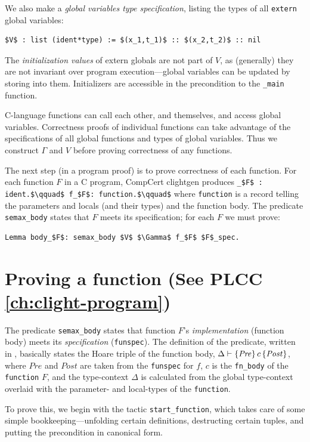 \documentclass[12pt,fleqn,openany,oneside,showtrims]{memoir}
\newcommand{\ychapter}[2]{\chapter[#1]{#1 \hfill \normalsize #2}}
\begin{document}
We also make a \emph{global variables type specification}, listing the 
types of all \lstinline{extern} global variables:
\begin{lstlisting}
$V$ : list (ident*type) := $(x_1,t_1)$ :: $(x_2,t_2)$ :: nil
\end{lstlisting}
The \emph{initialization values} of extern globals are not part of $V$,
as (generally) they are not invariant over program execution---global
variables can be updated by storing into them.  Initializers are accessible
in the precondition to the \lstinline{_main} function.

C-language functions can call each other, and themselves, and access global variables.  Correctness proofs of individual functions can take advantage of the
specifications of all global functions and types of global variables.
Thus we construct $\Gamma$ and $V$ before proving correctness of any
functions.

The next  step (in a program proof) is to prove correctness of each function.
For each function $F$  in a C program, CompCert clightgen produces\linebreak
\lstinline{_$F$ : ident.$\qquad$ f_$F$: function.$\qquad$}
where \lstinline{function} is a record telling the parameters and locals (and their types) and the function body.  The predicate \lstinline{semax_body} states that $F$ meets its specification; for each $F$ we must prove:
\begin{lstlisting}
Lemma body_$F$: semax_body $V$ $\Gamma$ f_$F$ $F$_spec.
\end{lstlisting}

\ychapter{Proving a function}{(See PLCC \autoref{ch:clight-program})}

The predicate \lstinline{semax_body} states that
function $F$'s \emph{implementation} (function body)
meets its \emph{specification} (\lstinline{funspec}).
The definition of the predicate, written in ,
basically states the Hoare triple of the function body,
$\Delta\vdash \{\mathit{Pre}\}\,c\,\{\mathit{Post}\}$, where
$\mathit{Pre}$ and $\mathit{Post}$ are taken from the \lstinline{funspec}
for $f$, $c$ is the \lstinline{fn_body} of the \lstinline{function} $F$,
and the type-context $\Delta$ is calculated from the global type-context
overlaid with the parameter- and local-types of the  \lstinline{function}.

To prove this, we begin with the tactic \lstinline{start_function},
which takes care of some simple bookkeeping---unfolding certain
definitions, destructing certain tuples, and putting the precondition
in canonical form.
\end{document}
